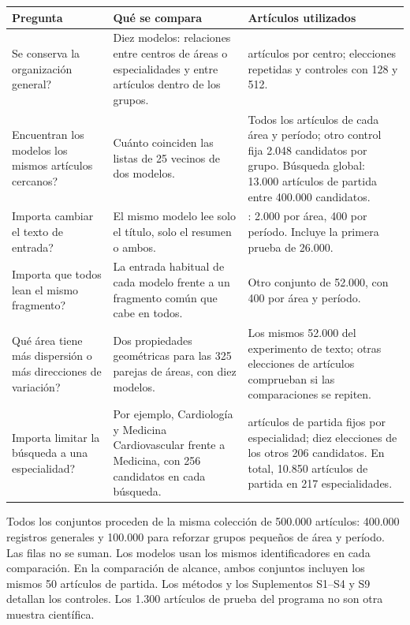 \par\noindent\begin{minipage}{\linewidth}
\small
\setlength{\tabcolsep}{4pt}
\renewcommand{\arraystretch}{1.10}
\label{tab:T01}
\begin{tabular}{@{}>{\raggedright\arraybackslash}p{4.0cm}>{\raggedright\arraybackslash}p{5.4cm}>{\raggedright\arraybackslash}p{5.75cm}@{}}
\toprule
\textbf{Pregunta} & \textbf{Qué se compara} & \textbf{Artículos utilizados} \\
\midrule
\textquestiondown{}Se conserva la organización general? & Diez modelos: relaciones entre centros de áreas o especialidades y entre artículos dentro de los grupos. & 256 artículos por centro; elecciones repetidas y controles con 128 y 512. \\
\addlinespace[8pt]
\textquestiondown{}Encuentran los modelos los mismos artículos cercanos? & Cuánto coinciden las listas de 25 vecinos de dos modelos. & Todos los artículos de cada área y período; otro control fija 2.048 candidatos por grupo. Búsqueda global: 13.000 artículos de partida entre 400.000 candidatos. \\
\addlinespace[8pt]
\textquestiondown{}Importa cambiar el texto de entrada? & El mismo modelo lee solo el título, solo el resumen o ambos. & 52.000: 2.000 por área, 400 por período. Incluye la primera prueba de 26.000. \\
\addlinespace[8pt]
\textquestiondown{}Importa que todos lean el mismo fragmento? & La entrada habitual de cada modelo frente a un fragmento común que cabe en todos. & Otro conjunto de 52.000, con 400 por área y período. \\
\addlinespace[8pt]
\textquestiondown{}Qué área tiene más dispersión o más direcciones de variación? & Dos propiedades geométricas para las 325 parejas de áreas, con diez modelos. & Los mismos 52.000 del experimento de texto; otras elecciones de artículos comprueban si las comparaciones se repiten. \\
\addlinespace[8pt]
\textquestiondown{}Importa limitar la búsqueda a una especialidad? & Por ejemplo, Cardiología y Medicina Cardiovascular frente a Medicina, con 256 candidatos en cada búsqueda. & 50 artículos de partida fijos por especialidad; diez elecciones de los otros 206 candidatos. En total, 10.850 artículos de partida en 217 especialidades. \\
\bottomrule
\end{tabular}
\par\smallskip
Todos los conjuntos proceden de la misma colección de 500.000 artículos: 400.000 registros generales y 100.000 para reforzar grupos pequeños de área y período. Las filas no se suman. Los modelos usan los mismos identificadores en cada comparación. En la comparación de alcance, ambos conjuntos incluyen los mismos 50 artículos de partida. Los métodos y los Suplementos S1--S4 y S9 detallan los controles. Los 1.300 artículos de prueba del programa no son otra muestra científica.
\end{minipage}\par
